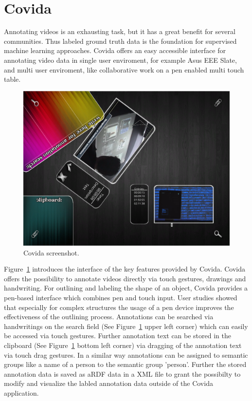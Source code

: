 \section{Covida}
Annotating videos is an exhausting task, but it has a great benefit for several communities. 
Thus labeled ground truth data is the foundation for supervised machine learning approaches. 
Covida offers an easy accessible interface for annotating video data in single user enviroment, for example Asus EEE Slate, and multi user enviroment, like collaborative work on a pen enabled multi touch table.
\par
\label{sec:intro}
\begin{figure}[!ht]
\captionsetup{type=figure} 
 \centering
 \includegraphics[width=.85\columnwidth]{screenshot}
 \caption{Covida screenshot.}
 \label{fig:overview1}
\end{figure}
Figure~\ref{fig:overview1} introduces the interface of the key features provided by Covida.
Covida offers the possibility to annotate videos directly via touch gestures, drawings and handwriting.
For outlining and labeling the shape of an object, Covida provides a pen-based interface which combines pen and touch input. 
User studies showed that especially for complex structures the usage of a pen device improves the effectiveness of the outlining process.
Annotations can be searched via handwritings on the search field (See Figure~\ref{fig:overview1} upper left corner) which can easily be accessed via touch gestures.
Further annotation text can be stored in the clipboard (See Figure~\ref{fig:overview1} bottom left corner) via dragging of the annotation text via touch drag gestures.
In a similar way annotations can be assigned to semantic groups like a name of a person to the semantic group 'person'.
Further the stored annotation data is saved as aRDF data in a XML file to grant the possibilty to modify and visualize the labled annotation data outside of the Covida application.
